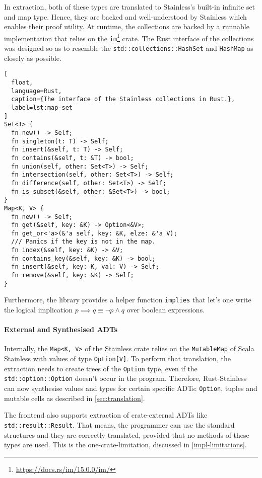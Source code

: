 In extraction, both of these types are translated to Stainless's built-in
infinite set and map type. Hence, they are backed and well-understood by
Stainless which enables their proof utility. At runtime, the collections are
backed by a runnable implementation that relies on the
\lstinline!im!\footnote{\url{https://docs.rs/im/15.0.0/im/}} crate. The Rust
interface of the collections was designed so as to resemble the
\lstinline!std::collections::HashSet! and \lstinline!HashMap! as closely as
possible.

\begin{lstlisting}[
  float,
  language=Rust,
  caption={The interface of the Stainless collections in Rust.},
  label=lst:map-set
]
Set<T> {
  fn new() -> Self;
  fn singleton(t: T) -> Self;
  fn insert(&self, t: T) -> Self;
  fn contains(&self, t: &T) -> bool;
  fn union(self, other: Set<T>) -> Self;
  fn intersection(self, other: Set<T>) -> Self;
  fn difference(self, other: Set<T>) -> Self;
  fn is_subset(&self, other: &Set<T>) -> bool;
}
Map<K, V> {
  fn new() -> Self;
  fn get(&self, key: &K) -> Option<&V>;
  fn get_or<'a>(&'a self, key: &K, elze: &'a V);
  /// Panics if the key is not in the map.
  fn index(&self, key: &K) -> &V;
  fn contains_key(&self, key: &K) -> bool;
  fn insert(&self, key: K, val: V) -> Self;
  fn remove(&self, key: &K) -> Self;
}
\end{lstlisting}

Furthermore, the library provides a helper function
\passthrough{\lstinline!implies!} that let's one write the logical
implication $p \implies q \equiv \neg{p} \land q$ over boolean expressions.


\paragraph{External and Synthesised ADTs}

Internally, the \lstinline!Map<K, V>! of the Stainless crate relies on the
\lstinline!MutableMap! of Scala Stainless with values of type
\lstinline!Option[V]!. To perform that translation, the extraction needs to
create trees of the \lstinline!Option! type, even if the
\lstinline!std::option::Option! doesn't occur in the program. Therefore,
Rust-Stainless can now synthesise values and types for certain specific ADTs:
\lstinline!Option!, tuples and mutable cells as described in
\autoref{sec:translation}.

The frontend also supports extraction of crate-external ADTs like
\lstinline!std::result::Result!. That means, the programmer can use the standard
structures and they are correctly translated, provided that no methods of these
types are used. This is the one-crate-limitation, discussed in
\autoref{impl-limitations}.

